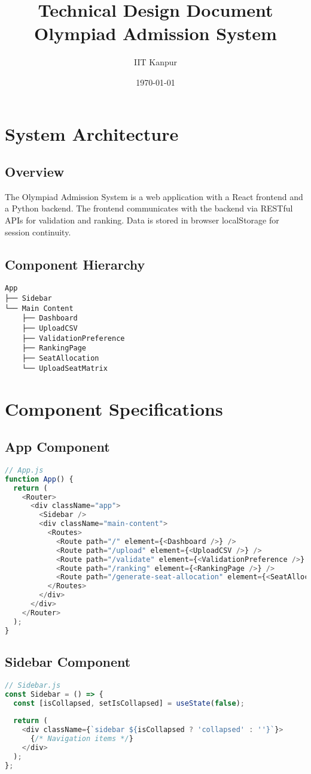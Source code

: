 \documentclass[12pt,a4paper]{article}
\title{Technical Design Document\\
       Olympiad Admission System}
\author{IIT Kanpur}
\date{\today}
\begin{document}
\maketitle
\tableofcontents
\newpage

\section{System Architecture}
\subsection{Overview}
The Olympiad Admission System is a web application with a React frontend and a Python backend. The frontend communicates with the backend via RESTful APIs for validation and ranking. Data is stored in browser localStorage for session continuity.

\subsection{Component Hierarchy}
\begin{verbatim}
App
├── Sidebar
└── Main Content
    ├── Dashboard
    ├── UploadCSV
    ├── ValidationPreference
    ├── RankingPage
    ├── SeatAllocation
    └── UploadSeatMatrix
\end{verbatim}

\section{Component Specifications}

\subsection{App Component}
\begin{lstlisting}[language=JavaScript]
// App.js
function App() {
  return (
    <Router>
      <div className="app">
        <Sidebar />
        <div className="main-content">
          <Routes>
            <Route path="/" element={<Dashboard />} />
            <Route path="/upload" element={<UploadCSV />} />
            <Route path="/validate" element={<ValidationPreference />} />
            <Route path="/ranking" element={<RankingPage />} />
            <Route path="/generate-seat-allocation" element={<SeatAllocation />} />
          </Routes>
        </div>
      </div>
    </Router>
  );
}
\end{lstlisting}

\subsection{Sidebar Component}
\begin{lstlisting}[language=JavaScript]
// Sidebar.js
const Sidebar = () => {
  const [isCollapsed, setIsCollapsed] = useState(false);
  
  return (
    <div className={`sidebar ${isCollapsed ? 'collapsed' : ''}`}>
      {/* Navigation items */}
    </div>
  );
};
\end{lstlisting}
\end{document}
